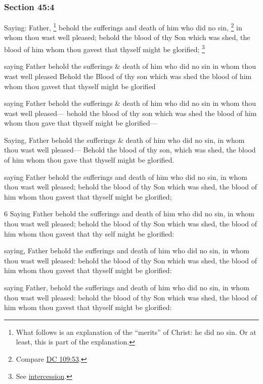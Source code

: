 	\subsubsection{Section 45:4} %
		\label{DC45-4}
		
		Saying: Father,
			\footnote{%
				What follows is an explanation of the ``merits'' of Christ: he did no sin. Or at least, this is part of the explanation.
				}%
		behold the sufferings and death of him who did no sin,%
			\footnote{%
				Compare \hyperref[DC109-53]{DC 109:53}.
				}
		in whom thou wast well pleased; behold the blood of thy Son which was shed, the blood of him whom thou gavest that thyself might be glorified;%
			\footnote{%
				See \hyperref[INTERCESSION]{intercession}.
				}
				
		\begin{framed}
		\scriptsize
			\begin{compactdesc}
				\item[JSP] saying Father behold the sufferings \& death of him who did no sin in whom thou wast well pleased Behold the Blood of thy son which was shed the blood of him whom thou gavest that thyself might be glorified
				\item[Partridge] saying Father behold the sufferings \& death of him who did no sin in whom thou wast well pleased--- behold the blood of thy son which was shed the blood of him whom thou gave that thyself might be glorified---
				\item[McLellin] Saying, Father behold the sufferings \& death of him who did no sin, in whom thou wast well pleased--- Behold the blood of thy son, which was shed, the blood of him whom thou gave that thyself might be glorified.
				\item[EMS] saying Father behold the sufferings and death of him who did no sin, in whom thou wast well pleased; behold the blood of thy Son which was shed, the blood of him whom thou gavest that thyself might be glorified;
				\item[BC] 6 Saying Father behold the sufferings and death of him who did no sin, in whom thou wast well pleased; behold the blood of thy Son which was shed, the blood of him whom thou gavest that thy self might be glorified:
				\item[DC 1835] saying, Father behold the sufferings and death of him who did no sin, in whom thou wast well pleased: behold the blood of thy Son which was shed, the blood of him whom thou gavest that thyself might be glorified:
				\item[DC 1844] saying Father, behold the sufferings and death of him who did no sin, in whom thou wast well pleased: behold the blood of thy Son which was shed, the blood of him whom thou gavest that thyself might be glorified:
			\end{compactdesc}
		\end{framed}
		
